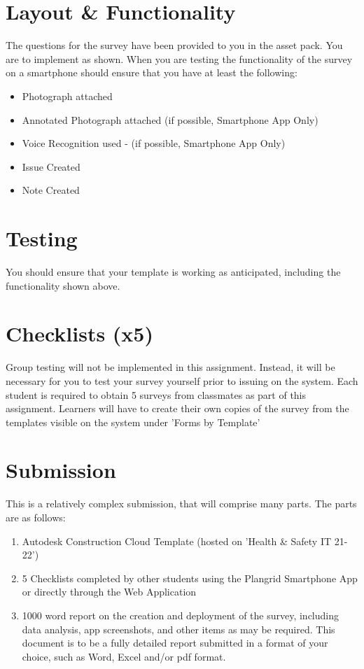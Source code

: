 \newpage
\section*{Layout \& Functionality}

The questions for the survey have been provided to you in the asset pack.  You are to implement as shown.  When you are testing the functionality of the survey on a smartphone should ensure that you have at least the following:

\begin{itemize}
	\item Photograph attached  
	\item Annotated Photograph attached (if possible, Smartphone App Only)
	\item Voice Recognition used - (if possible, Smartphone App Only)
	\item Issue Created
	\item Note Created
\end{itemize}

\section*{Testing}
You should ensure that your template is working as anticipated, including the functionality shown above.


\newpage
\section*{Checklists (x5)}
Group testing will not be implemented in this assignment.  Instead, it will be necessary for you to test your survey yourself prior to issuing on the system.  Each student is required to obtain 5 surveys from classmates as part of this assignment.  Learners will have to create their own copies of the survey from the templates visible on the system under 'Forms by Template'






\section*{Submission}
This is a relatively complex submission, that will comprise many parts.  The parts are as follows:
\begin{enumerate}
	\item Autodesk Construction Cloud Template (hosted on 'Health \& Safety IT 21-22')
	\item 5 Checklists completed by other students using the Plangrid Smartphone App or directly through the Web Application
	\item 1000 word report on the creation and deployment of the survey, including data analysis, app screenshots, and other items as may be required.  This document is to be a fully detailed report submitted in a format of your choice, such as Word, Excel and/or pdf format.
\end{enumerate}



